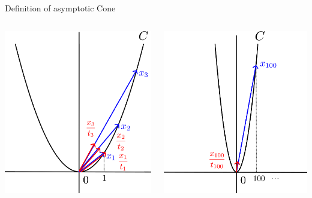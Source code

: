 \documentclass[aspectratio=169, dvipdfmx, 11pt]{beamer}
\begin{document}
\begin{frame}{Definition of asymptotic Cone}
  \centering
  \begin{columns}
    \pause
    \begin{column}{0.32\textwidth}
    \centering
    \includegraphics[keepaspectratio, scale=0.032]{figures/asymptotic_cone_example/x*x_graph+example_vectors.eps}
    \end{column}
    \pause
    \begin{column}{0.32\textwidth}
    \centering
    \includegraphics[keepaspectratio, scale=0.032]{figures/asymptotic_cone_example/x*x_graph+a_large_vector.eps}

\end{column}
\end{columns}
\end{frame}
\end{document}
